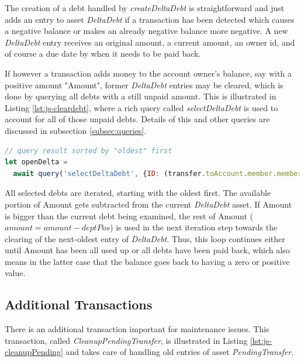 The creation of a debt handled by \textit{createDeltaDebt} is straightforward and just adds an entry to asset \textit{DeltaDebt} if a transaction has been detected which causes a negative balance or makes an already negative balance more negative. A new \textit{DeltaDebt} entry receives an original amount, a current amount, an owner id, and of course a due date by when it needs to be paid back.

If however a transaction adds money to the account owner's balance, say with a positive amount "Amount", former \textit{DeltaDebt} entries may be cleared, which is done by querying all debts with a still unpaid amount. This is illustrated in Listing \ref{lst:js-cleardebt}, where a rich query called \textit{selectDeltaDebt} is used to account for all of those unpaid debts. Details of this and other queries are discussed in subsection \ref{subsec:queries}.

\begin{center}
\begin{minipage}{0.8\textwidth}
\small
\begin{lstlisting}[language=javascript,firstnumber=1,caption={\bf\small clearDebt JavaScript excerpt}, captionpos=b,label=lst:js-cleardebt]
// query result sorted by "oldest" first
let openDelta =
  await query('selectDeltaDebt', {ID: (transfer.toAccount.member.memberID)});
\end{lstlisting}
\end{minipage}
\end{center}

All selected debts are iterated, starting with the oldest first. The available portion of Amount gets subtracted from the current \textit{DeltaDebt} asset. If Amount is bigger than the current debt being examined, the rest of Amount ($amount = amount - deptPos$) is used in the next iteration step towards the clearing of the next-oldest entry of \textit{DeltaDebt}. Thus, this loop continues either until Amount has been all used up or all debts have been paid back, which also means in the latter case that the balance goes back to having a zero or positive value.

\subsection{Additional Transactions}

There is an additional transaction important for maintenance issues. This transaction, called \textit{CleanupPendingTransfer}, is illustrated in Listing \ref{lst:js-cleanupPending} and takes care of handling old entries of asset \textit{PendingTransfer}.

